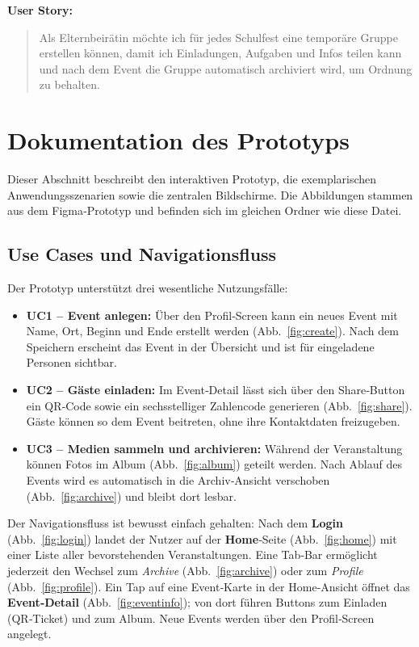 \documentclass[11pt,a4paper]{article}
\begin{document}
\textbf{User Story:}
\begin{quote}
Als Elternbeirätin möchte ich für jedes Schulfest eine temporäre Gruppe erstellen können, damit ich Einladungen, Aufgaben und Infos teilen kann und nach dem Event die Gruppe automatisch archiviert wird, um Ordnung zu behalten.
\end{quote}

\section*{Dokumentation des Prototyps}

Dieser Abschnitt beschreibt den interaktiven Prototyp, die exemplarischen Anwendungsszenarien sowie die zentralen Bildschirme. Die Abbildungen stammen aus dem Figma‑Prototyp und befinden sich im gleichen Ordner wie diese Datei.

\subsection*{Use Cases und Navigationsfluss}
Der Prototyp unterstützt drei wesentliche Nutzungsfälle:
\begin{itemize}
  \item \textbf{UC1 – Event anlegen:} Über den Profil‑Screen kann ein neues Event mit Name, Ort, Beginn und Ende erstellt werden (Abb.~\ref{fig:create}). Nach dem Speichern erscheint das Event in der Übersicht und ist für eingeladene Personen sichtbar.
  \item \textbf{UC2 – Gäste einladen:} Im Event‑Detail lässt sich über den Share‑Button ein QR‑Code sowie ein sechsstelliger Zahlencode generieren (Abb.~\ref{fig:share}). Gäste können so dem Event beitreten, ohne ihre Kontaktdaten freizugeben.
  \item \textbf{UC3 – Medien sammeln und archivieren:} Während der Veranstaltung können Fotos im Album (Abb.~\ref{fig:album}) geteilt werden. Nach Ablauf des Events wird es automatisch in die Archiv‑Ansicht verschoben (Abb.~\ref{fig:archive}) und bleibt dort lesbar.
\end{itemize}

Der Navigationsfluss ist bewusst einfach gehalten: Nach dem \textbf{Login} (Abb.~\ref{fig:login}) landet der Nutzer auf der \textbf{Home}‑Seite (Abb.~\ref{fig:home}) mit einer Liste aller bevorstehenden Veranstaltungen. Eine Tab‑Bar ermöglicht jederzeit den Wechsel zum \emph{Archive} (Abb.~\ref{fig:archive}) oder zum \emph{Profile} (Abb.~\ref{fig:profile}). Ein Tap auf eine Event‑Karte in der Home‑Ansicht öffnet das \textbf{Event‑Detail} (Abb.~\ref{fig:eventinfo}); von dort führen Buttons zum Einladen (QR‑Ticket) und zum Album. Neue Events werden über den Profil‑Screen angelegt.
\end{document}
